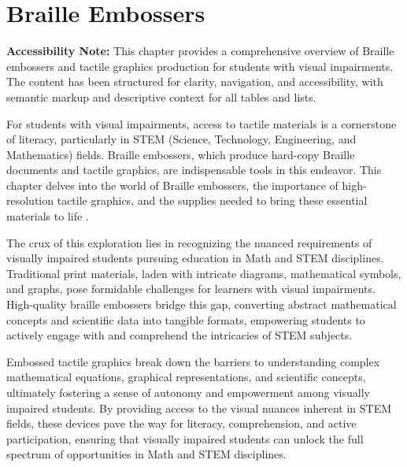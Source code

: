 \chapter{Braille Embossers}\label{ch4:braille-embossers}
\raggedright

\begin{raggedright}
	\textbf{Accessibility Note:} This chapter provides a comprehensive overview of Braille embossers and tactile graphics production for students with visual impairments. The content has been structured for clarity, navigation, and accessibility, with semantic markup and descriptive context for all tables and lists.
\end{raggedright}

For students with visual impairments, access to tactile materials is a cornerstone of literacy, particularly in STEM (Science, Technology, Engineering, and Mathematics) fields. Braille embossers, which produce hard-copy Braille documents and tactile graphics, are indispensable tools in this endeavor. This chapter delves into the world of Braille embossers, the importance of high-resolution tactile graphics, and the supplies needed to bring these essential materials to life \cite{Perkins, TactileView, CreatingTactileGraphics, AELData}.

The crux of this exploration lies in recognizing the nuanced requirements of visually impaired students pursuing education in Math and STEM disciplines. Traditional print materials, laden with intricate diagrams, mathematical symbols, and graphs, pose formidable challenges for learners with visual impairments. High-quality braille embossers bridge this gap, converting abstract mathematical concepts and scientific data into tangible formats, empowering students to actively engage with and comprehend the intricacies of STEM subjects.

Embossed tactile graphics break down the barriers to understanding complex mathematical equations, graphical representations, and scientific concepts, ultimately fostering a sense of autonomy and empowerment among visually impaired students. By providing access to the visual nuances inherent in STEM fields, these devices pave the way for literacy, comprehension, and active participation, ensuring that visually impaired students can unlock the full spectrum of opportunities in Math and STEM disciplines.\supercite{NYUWorkflow, ProBlind}

